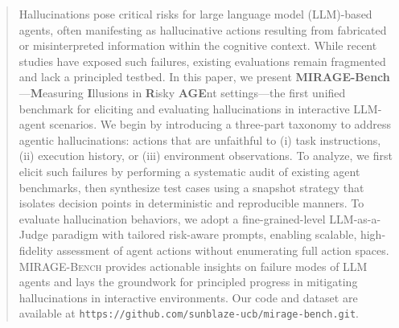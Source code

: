 \begin{abstract}
Hallucinations pose critical risks for large language model (LLM)-based agents, often manifesting as hallucinative actions resulting from fabricated or misinterpreted information within the cognitive context. While recent studies have exposed such failures, existing evaluations remain fragmented and lack a principled testbed. In this paper, we present \textbf{MIRAGE-Bench}---\textbf{M}easuring \textbf{I}llusions in \textbf{R}isky \textbf{AGE}nt settings---the first unified benchmark for eliciting and evaluating hallucinations in interactive LLM-agent scenarios. We begin by introducing a three-part taxonomy to address agentic hallucinations: actions that are unfaithful to (i) task instructions, (ii) execution history, or (iii) environment observations. To analyze, we first elicit such failures by performing a systematic audit of existing agent benchmarks, then synthesize test cases using a snapshot strategy that isolates decision points in deterministic and reproducible manners. To evaluate hallucination behaviors, we adopt a fine-grained-level LLM-as-a-Judge paradigm with tailored risk-aware prompts, enabling scalable, high-fidelity assessment of agent actions without enumerating full action spaces. \textsc{MIRAGE-Bench} provides actionable insights on failure modes of LLM agents and lays the groundwork for principled progress in mitigating hallucinations in interactive environments. Our code and dataset are available at \texttt{https://github.com/sunblaze-ucb/mirage-bench.git}.
\end{abstract}